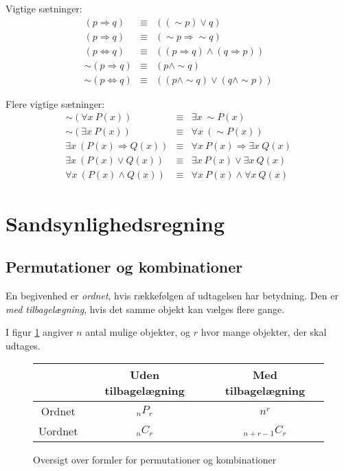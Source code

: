 \documentclass[a4paper]{article}
\begin{document}
Vigtige sætninger:
\begin{eqnarray}
(p\Rightarrow q) &\equiv& ((\sim p) \vee q) \\
(p \Rightarrow q) &\equiv& (\sim p \Rightarrow \sim q) \\
(p \Leftrightarrow q) &\equiv& ((p \Rightarrow q) \wedge (q \Rightarrow p)) \\
\sim (p \Rightarrow q) &\equiv& (p \wedge \sim q) \\
\sim (p \Leftrightarrow q) &\equiv& ((p \wedge \sim q) \vee (q \wedge \sim p))
\end{eqnarray}

Flere vigtige sætninger:
\begin{eqnarray}
\sim (\forall x~P(x)) &\equiv& \exists x~\sim P(x) \\
\sim (\exists x~P(x)) &\equiv& \forall x~(\sim P(x)) \\
\exists x~(P(x) \Rightarrow Q(x)) &\equiv& \forall x~P(x) \Rightarrow \exists x~Q(x) \\
\exists x~(P(x) \vee Q(x)) &\equiv& \exists x~P(x) \vee \exists x~Q(x) \\
\forall x~(P(x) \wedge Q(x)) &\equiv& \forall x~P(x) \wedge \forall x~Q(x)
\end{eqnarray}

\section{Sandsynlighedsregning}

\subsection{Permutationer og kombinationer}
En begivenhed er {\it ordnet}, hvis rækkefølgen af udtagelsen har betydning. Den er
{\it med tilbagelægning}, hvis det samme objekt kan vælges flere gange.

I figur \ref{fig:perm} angiver $n$ antal mulige objekter, og $r$ hvor mange objekter,
der skal udtages.

\begin{figure}[h!]
    \begin{center}
    \begin{tabular}{|c|c|c|}
        \hline
        & Uden tilbagelægning & Med tilbagelægning \\
        \hline
        Ordnet  & $_nP_r$ & $n^r$ \\
        \hline
        Uordnet & $_nC_r$ & $_{n+r-1}C_r$ \\
        \hline
    \end{tabular}
    \end{center}
    \caption{Oversigt over formler for permutationer og kombinationer} \label{fig:perm}
\end{figure}
\end{document}
